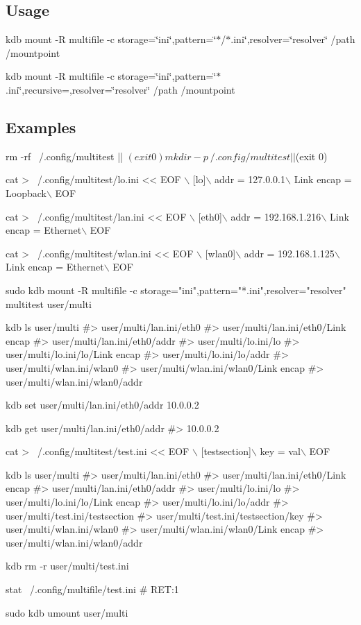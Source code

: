 \subsection*{Usage}

{\ttfamily kdb mount -\/R multifile -\/c storage=\char`\"{}ini\char`\"{},pattern=\char`\"{}$\ast$/$\ast$.\+ini\char`\"{},resolver=\char`\"{}resolver\char`\"{} /path /mountpoint}

{\ttfamily kdb mount -\/R multifile -\/c storage=\char`\"{}ini\char`\"{},pattern=\char`\"{}$\ast$.\+ini\char`\"{},recursive=,resolver=\char`\"{}resolver\char`\"{} /path /mountpoint}

\subsection*{Examples}


\begin{DoxyCode}
rm -rf ~/.config/multitest || $(exit 0)
mkdir -p ~/.config/multitest || $(exit 0)

cat > ~/.config/multitest/lo.ini << EOF \(\backslash\)
[lo]\(\backslash\)
addr = 127.0.0.1\(\backslash\)
Link encap = Loopback\(\backslash\)
EOF

cat > ~/.config/multitest/lan.ini << EOF \(\backslash\)
[eth0]\(\backslash\)
addr = 192.168.1.216\(\backslash\)
Link encap = Ethernet\(\backslash\)
EOF

cat > ~/.config/multitest/wlan.ini << EOF \(\backslash\)
[wlan0]\(\backslash\)
addr = 192.168.1.125\(\backslash\)
Link encap = Ethernet\(\backslash\)
EOF

sudo kdb mount -R multifile -c storage="ini",pattern="*.ini",resolver="resolver" multitest user/multi

kdb ls user/multi
#> user/multi/lan.ini/eth0
#> user/multi/lan.ini/eth0/Link encap
#> user/multi/lan.ini/eth0/addr
#> user/multi/lo.ini/lo
#> user/multi/lo.ini/lo/Link encap
#> user/multi/lo.ini/lo/addr
#> user/multi/wlan.ini/wlan0
#> user/multi/wlan.ini/wlan0/Link encap
#> user/multi/wlan.ini/wlan0/addr

kdb set user/multi/lan.ini/eth0/addr 10.0.0.2

kdb get user/multi/lan.ini/eth0/addr
#> 10.0.0.2

cat > ~/.config/multitest/test.ini << EOF \(\backslash\)
[testsection]\(\backslash\)
key = val\(\backslash\)
EOF

kdb ls user/multi
#> user/multi/lan.ini/eth0
#> user/multi/lan.ini/eth0/Link encap
#> user/multi/lan.ini/eth0/addr
#> user/multi/lo.ini/lo
#> user/multi/lo.ini/lo/Link encap
#> user/multi/lo.ini/lo/addr
#> user/multi/test.ini/testsection
#> user/multi/test.ini/testsection/key
#> user/multi/wlan.ini/wlan0
#> user/multi/wlan.ini/wlan0/Link encap
#> user/multi/wlan.ini/wlan0/addr

kdb rm -r user/multi/test.ini

stat ~/.config/multifile/test.ini
# RET:1

sudo kdb umount user/multi
\end{DoxyCode}


